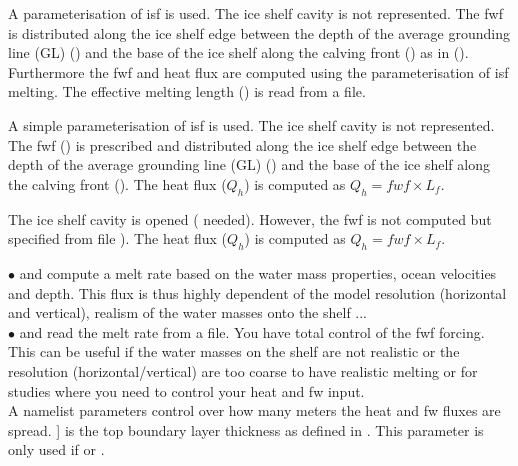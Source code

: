 \documentclass[../tex_main/NEMO_manual]{subfiles}
\begin{document}
\begin{description}
\begin{description}
   \end{description}
 \item[\np{nn\_isf}\forcode{ = 2}]
   A parameterisation of isf is used. The ice shelf cavity is not represented.
   The fwf is distributed along the ice shelf edge between the depth of the average grounding line (GL)
   () and the base of the ice shelf along the calving front
   () as in ().
   Furthermore the fwf and heat flux are computed using the \citet{Beckmann2003} parameterisation of isf melting.
   The effective melting length () is read from a file.
 \item[\np{nn\_isf}\forcode{ = 3}]
   A simple parameterisation of isf is used. The ice shelf cavity is not represented.
   The fwf () is prescribed and distributed along the ice shelf edge between
   the depth of the average grounding line (GL) () and
   the base of the ice shelf along the calving front ().
   The heat flux ($Q_h$) is computed as $Q_h = fwf \times L_f$.
 \item[\np{nn\_isf}\forcode{ = 4}]
   The ice shelf cavity is opened ( needed).
   However, the fwf is not computed but specified from file ).
   The heat flux ($Q_h$) is computed as $Q_h = fwf \times L_f$.\\
\end{description}

$\bullet$  and  compute a melt rate based on
the water mass properties, ocean velocities and depth.
This flux is thus highly dependent of the model resolution (horizontal and vertical),
realism of the water masses onto the shelf ...\\

$\bullet$  and  read the melt rate from a file.
You have total control of the fwf forcing.
This can be useful if the water masses on the shelf are not realistic or
the resolution (horizontal/vertical) are too coarse to have realistic melting or
for studies where you need to control your heat and fw input.\\ 

A namelist parameters control over how many meters the heat and fw fluxes are spread.
] is the top boundary layer thickness as defined in \citet{Losch2008}.
This parameter is only used if  or .
\end{document}
